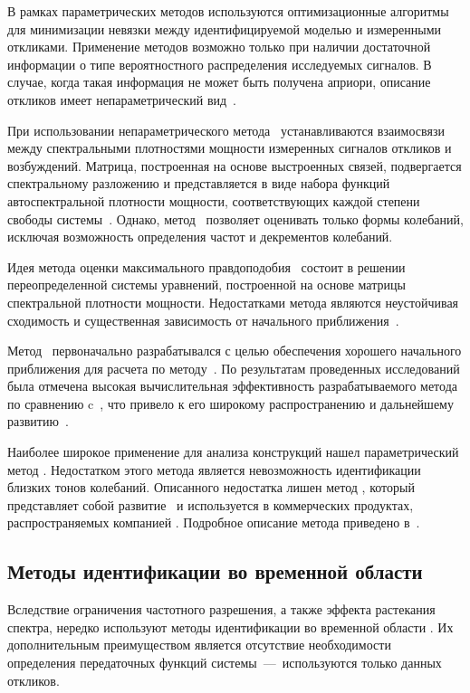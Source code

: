 В рамках параметрических методов используются оптимизационные алгоритмы для минимизации невязки между идентифицируемой моделью и измеренными откликами. Применение методов возможно только при наличии достаточной информации о типе вероятностного распределения исследуемых сигналов. В случае, когда такая информация не может быть получена априори, описание откликов имеет непараметрический вид~\cite{lib:oma:Peeters&Roeck}. 

При использовании непараметрического метода~ устанавливаются взаимосвязи между спектральными плотностями мощности измеренных сигналов откликов и возбуждений. Матрица, построенная на основе выстроенных связей, подвергается спектральному разложению и представляется в виде набора функций автоспектральной плотности мощности, соответствующих каждой степени свободы системы~\cite{lib:oma:Cardenas}. Однако, метод~ позволяет оценивать только формы колебаний, исключая возможность определения частот и декрементов колебаний.

Идея метода оценки максимального правдоподобия~ состоит в решении переопределенной системы уравнений, построенной на основе матрицы спектральной плотности мощности. Недостатками метода являются неустойчивая сходимость и существенная зависимость от начального приближения~\cite{lib:oma:Hermans}.

Метод~ первоначально разрабатывался с целью обеспечения хорошего начального приближения для расчета по методу~. По результатам проведенных исследований была отмечена высокая вычислительная эффективность разрабатываемого метода по сравнению c~, что привело к его широкому распространению и дальнейшему развитию~\cite{lib:oma:Verboven}.

Наиболее широкое применение для анализа конструкций нашел параметрический метод  \cite{lib:oma:Guillaume}. Недостатком этого метода является невозможность идентификации близких тонов колебаний. Описанного недостатка лишен метод , который представляет собой развитие~ и используется в коммерческих продуктах, распространяемых компанией . Подробное описание метода приведено в~\cite{lib:oma:Peeters&Auweraer}.

\subsection{Методы идентификации во временной области}

Вследствие ограничения частотного разрешения, а также эффекта растекания спектра, нередко используют методы идентификации во временной области . Их дополнительным преимуществом является отсутствие необходимости определения передаточных функций системы~---~используются только данных откликов.

